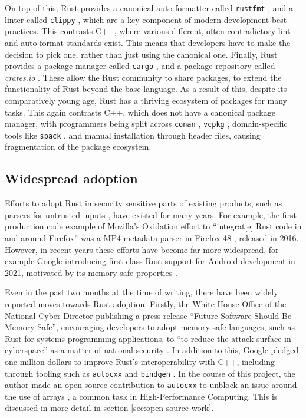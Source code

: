 On top of this, Rust provides a canonical auto-formatter called \texttt{rustfmt} \cite{RustlangRustfmt2024}, and a linter called \texttt{clippy} \cite{RustlangRustclippy2024}, which are a key component of modern development best practices. This contrasts C++, where various different, often contradictory lint and auto-format standards exist. This means that developers have to make the decision to pick one, rather than just using the canonical one. Finally, Rust provides a package manager called \texttt{cargo} \cite{RustlangCargo2024}, and a package repository called \textit{crates.io} \cite{CratesIoRust}. These allow the Rust community to share packages,
to extend the functionality of Rust beyond the base language. As a result of this, despite its comparatively young age, Rust has a thriving ecosystem of packages for many tasks. This again contrasts C++, which does not have a canonical package manager, with programmers being split across \texttt{conan} \cite{ConanioConan2024}, \texttt{vcpkg} \cite{MicrosoftVcpkg2024}, domain-specific tools like \texttt{spack} \cite{gamblin2015spack}, and manual installation through header files, causing fragmentation of the package ecosystem.

\subsection{Widespread adoption}
\label{ssec:rust-adoption}

Efforts to adopt Rust in security sensitive parts of existing products, such as parsers for untrusted inputs \cite{OxidationMozillaWiki}, have existed for many years. For example, the first production code example of Mozilla's Oxidation effort to ``integrat[e] Rust code in and around Firefox'' was a MP4 metadata parser in Firefox 48 \cite{OxidationMozillaWiki}, released in 2016. However, in recent years these efforts have become far more widespread, for example Google introducing first-class Rust support for Android development in 2021, motivated by its memory safe properties \cite{RustAndroidPlatform}.

Even in the past two months at the time of writing, there have been widely reported moves towards Rust adoption. Firstly, the White House Office of the National Cyber Director publishing a press release ``Future Software Should Be Memory Safe'', encouraging developers to adopt memory safe languages, such as Rust for systems programming applications, to ``to reduce the attack surface in cyberspace'' as a matter of national security \cite{PressReleaseFuture2024}. In addition to this, Google pledged one million dollars to improve Rust's interoperability with C++, including through tooling such as \texttt{autocxx} \cite{GoogleAutocxx2024} and \texttt{bindgen} \cite{RustlangRustbindgen2024}. In the course of this project, the author made an open source contribution to \texttt{autocxx} to unblock an issue around the use of arrays \cite{goodmanAddIntegrationTests}, a common task in High-Performance Computing. This is discussed in more detail in section \ref{sec:open-source-work}.






